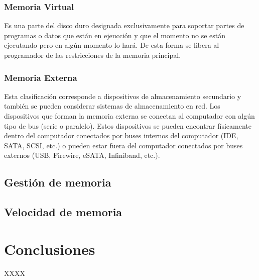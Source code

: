 \documentclass{article}
\begin{document}
\subsubsection{Memoria Virtual}
Es una parte del disco duro designada exclusivamente para soportar partes de programas o datos que están en ejeucción y que el momento no se están ejecutando pero en algún momento lo hará. De esta forma se libera al programador de las restricciones de la memoria principal.

\subsubsection{Memoria Externa}
Esta clasificación corresponde a dispositivos de almacenamiento secundario y también se pueden considerar sistemas de almacenamiento en red. Los dispositivos que forman la memoria externa se conectan al computador con algún tipo de bus (serie o paralelo). Estos dispositivos se pueden encontrar físicamente dentro del computador conectados por buses internos del computador (IDE, SATA, SCSI, etc.) o pueden estar fuera del computador conectados por buses externos (USB, Firewire, eSATA, Infiniband, etc.).\cite{Estructura}



\subsection{Gestión de memoria}

\subsection{Velocidad de memoria}






\section{Conclusiones} \label{conclusion}
XXXX



\end{document}
